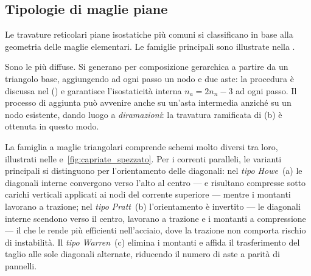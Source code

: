 \subsection{Tipologie di maglie piane}
\label{subsec:tipologie_maglie}

Le travature reticolari piane isostatiche più comuni
si classificano in base alla geometria delle maglie
elementari. Le famiglie principali sono illustrate
nella .








Sono le più diffuse. Si generano per composizione
gerarchica a partire da un triangolo base, aggiungendo
ad ogni passo un nodo e due aste: la procedura è
discussa nel 
() e garantisce
l'isostaticità interna $n_a = 2n_n - 3$ ad ogni
passo. Il processo di aggiunta può avvenire anche
su un'asta intermedia anziché su un nodo esistente,
dando luogo a \emph{diramazioni}: la travatura
ramificata di (b) è
ottenuta in questo modo.

La famiglia a maglie triangolari comprende schemi
molto diversi tra loro, illustrati nelle
e~\ref{fig:capriate_spezzato}.
Per i correnti paralleli, le varianti principali si
distinguono per l'orientamento delle diagonali: nel
\emph{tipo Howe}~(a)
le diagonali interne convergono verso l'alto al centro
--- e risultano compresse sotto carichi verticali
applicati ai nodi del corrente superiore --- mentre
i montanti lavorano a trazione;
nel \emph{tipo Pratt}~(b)
l'orientamento è invertito --- le diagonali interne
scendono verso il centro, lavorano a trazione e i
montanti a compressione --- il che le rende più
efficienti nell'acciaio, dove la trazione non comporta
rischio di instabilità.
Il \emph{tipo Warren}~(c)
elimina i montanti e affida il trasferimento del taglio
alle sole diagonali alternate, riducendo il numero di
aste a parità di pannelli.

